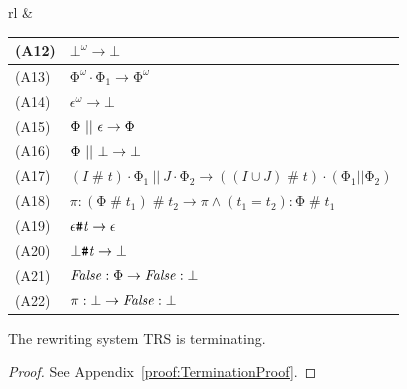 \documentclass[acmsmall,10pt,review]{acmart}
\newcommand{\effect}{{\ensuremath{\mathrm{\Phi}}}}
\newcommand{\choice}{\vee}
\newcommand{\code}[1]{{\tt{\ensuremath{\m{#1}}}}}
\newcommand{\empt}{\textcolor{black}{\ensuremath{\epsilon}}}
\newcommand{\bott}{\textcolor{black}{\ensuremath{\bot}}}
\newcommand{\m}{\mathit}
\newcommand{\mysharp}{{\mathrel{\texttt{\#}}}}
\newcommand\appref[1]{Appendix~\textcolor{blue}{\ref{#1}}}
\begin{document}
{\begin{enumerate}
\begin{table}[ht]
\begin{tabular}{rl}
  &
\footnotesize
  \begin{minipage}[t]{0.45\textwidth}
\begin{tabular}{||l|l|}
\hline
(A12)  &
\code{\bot^\omega  \rightarrow \bot }\\
\hline
(A13)  &
\code{\effect^\omega \cdot \effect_1 \rightarrow \effect^\omega }\\
\hline
(A14)  &
\code{\epsilon^\omega \rightarrow \bot }\\
\hline
(A15)  &
\code{ \effect\ ||\ \empt \rightarrow \effect}\\
\hline
(A16)  &
\code{ \effect\ ||\ \bott \rightarrow \bott}\\
\hline
(A17)  &
 \code{(I\mysharp  t) \cdot \effect_1\ ||\ J \cdot\effect_2 \rightarrow ((I  {\cup} J) \mysharp  t) \cdot (\effect_1 || \effect_2)}\\
\hline
(A18)  &
\code{\pi : (\effect \mysharp  t_1 ) \mysharp  t_2 \rightarrow \pi  \wedge (t_1 {=} t_2) : \effect \mysharp  t_1 }\\
\hline
(A19)  &
 \code{\empt \mysharp  t \rightarrow \empt}\\
\hline
(A20)  &
 \code{\bot \mysharp  t \rightarrow  \bott}\\
\hline
(A21)  &
 \code{{{False}} : \effect \rightarrow {{False}} : \bott}\\
\hline
(A22)  &
 \code{{\pi} : \bott \rightarrow {{False}} : \bott}\\
\hline


\end{tabular}
  \end{minipage}
  

 
\end{tabular}
\end{table}



\end{enumerate}






 
\begin{theorem}[Termination]\label{termination}
The rewriting system TRS is terminating.
\end{theorem}
\begin{proof}
See %
\appref{proof:TerminationProof}.
\end{proof}

}
\end{document}
